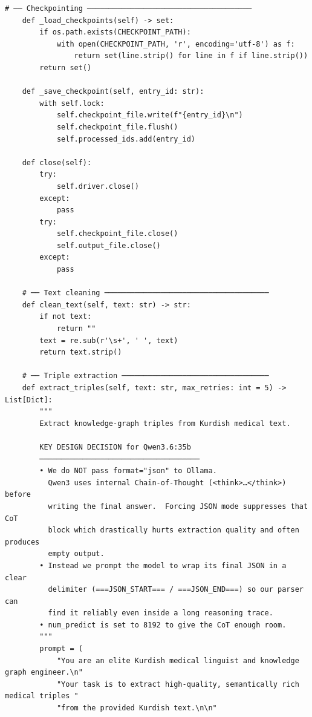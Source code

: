 \documentclass[11pt]{article}
\begin{document}
\begin{lstlisting}[style=pythoncode, caption={kg\_generator\_gpu\_1.py}]
    # ── Checkpointing ──────────────────────────────────────
    def _load_checkpoints(self) -> set:
        if os.path.exists(CHECKPOINT_PATH):
            with open(CHECKPOINT_PATH, 'r', encoding='utf-8') as f:
                return set(line.strip() for line in f if line.strip())
        return set()

    def _save_checkpoint(self, entry_id: str):
        with self.lock:
            self.checkpoint_file.write(f"{entry_id}\n")
            self.checkpoint_file.flush()
            self.processed_ids.add(entry_id)

    def close(self):
        try:
            self.driver.close()
        except:
            pass
        try:
            self.checkpoint_file.close()
            self.output_file.close()
        except:
            pass

    # ── Text cleaning ──────────────────────────────────────
    def clean_text(self, text: str) -> str:
        if not text:
            return ""
        text = re.sub(r'\s+', ' ', text)
        return text.strip()

    # ── Triple extraction ──────────────────────────────────
    def extract_triples(self, text: str, max_retries: int = 5) -> List[Dict]:
        """
        Extract knowledge-graph triples from Kurdish medical text.

        KEY DESIGN DECISION for Qwen3.6:35b
        ─────────────────────────────────────
        • We do NOT pass format="json" to Ollama.
          Qwen3 uses internal Chain-of-Thought (<think>…</think>) before
          writing the final answer.  Forcing JSON mode suppresses that CoT
          block which drastically hurts extraction quality and often produces
          empty output.
        • Instead we prompt the model to wrap its final JSON in a clear
          delimiter (===JSON_START=== / ===JSON_END===) so our parser can
          find it reliably even inside a long reasoning trace.
        • num_predict is set to 8192 to give the CoT enough room.
        """
        prompt = (
            "You are an elite Kurdish medical linguist and knowledge graph engineer.\n"
            "Your task is to extract high-quality, semantically rich medical triples "
            "from the provided Kurdish text.\n\n"


\end{lstlisting}
\end{document}
